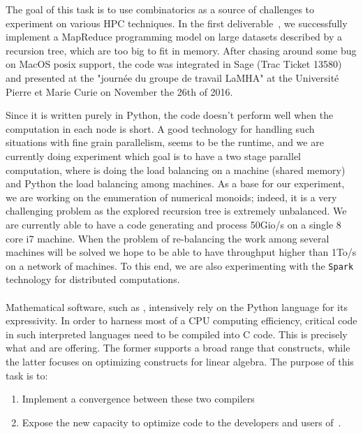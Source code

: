 \documentclass{deliverablereport}
\begin{document}
  The goal of this task is to use combinatorics as a source of challenges to
  experiment on various HPC techniques. In the first
  deliverable~, we successfully implement a
  MapReduce programming model on large datasets described by a recursion
  tree, which are too big to fit in memory. After chasing around some bug on
  MacOS posix support, the code was integrated in Sage (Trac Ticket 13580) and
  presented at the "journée du groupe de travail LaMHA" at the Université Pierre et
  Marie Curie on November the 26th of 2016.

  Since it is written purely in Python, the code doesn't perform well when the
  computation in each node is short. A good technology for handling such
  situations with fine grain parallelism, seems to be the 
   runtime, and we are currently doing experiment which goal is to have a two
  stage parallel computation, where  is doing the load balancing on a
  machine (shared memory) and Python the load balancing among machines. As a
  base for our experiment, we are working on the enumeration of numerical
  monoids; indeed, it is a very challenging problem as the explored recursion
  tree is extremely unbalanced. We are currently able to have a code
  generating and process 50Gio/s on a single 8 core i7 machine. When the
  problem of re-balancing the work among several machines will be solved we
  hope to be able to have throughput higher than 1To/s on a network of machines.
  To this end, we are also experimenting with the \texttt{Spark}
  technology for distributed computations.

  \paragraph{}

Mathematical software, such as \Sage, intensively rely on the Python
language for its expressivity. In order to harness most of a CPU computing
efficiency, critical code in such interpreted languages need to be compiled into
C code. This is precisely what \Cython and \Pythran are offering. The former
supports a broad range that \Python constructs, while the latter focuses on optimizing
\Numpy constructs for linear algebra.
The purpose of this task is to:
\begin{enumerate}
\item\label{pythran:cython} Implement a convergence between these two compilers
\item\label{pythran:sage} Expose the new capacity to optimize \Numpy code to
  the developers and  users of~\Sage.
\end{enumerate}
\end{document}
